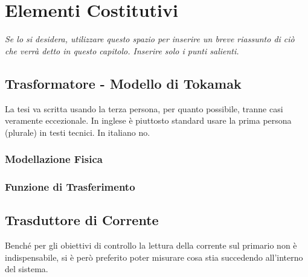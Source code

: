 \chapter{Elementi Costitutivi}\label{cap:1}

\begin{minipage}{12cm}\textit{Se lo si desidera, utilizzare questo spazio per inserire un breve riassunto di ci\`o che verr\`a detto in questo capitolo. Inserire solo i punti salienti.}
\end{minipage}

\vspace*{1cm}


\section{Trasformatore - Modello di Tokamak}\label{Trasformatore}

La tesi va scritta usando la terza persona, per quanto possibile, tranne casi veramente eccezionale. In inglese \`e piuttosto standard usare la prima persona (plurale) in testi tecnici. In italiano no.

\subsection{Modellazione Fisica}
\subsection{Funzione di Trasferimento}

\newpage


\section{Trasduttore di Corrente}\label{CurrentSense}
Benché per gli obiettivi di controllo la lettura della corrente sul primario non è indispensabile, si è però preferito poter misurare cosa stia succedendo all'interno del sistema.\\

